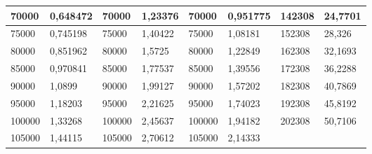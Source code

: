 \documentclass[11pt,openany]{book}
\begin{document}
\begin{table}[!ht]
\begin{tabular}{|l|l|l|l|l|l|l|l|}
        70000                                             & 0,648472                                           & 70000                                               & 1,23376                                             & 70000           & 0,951775        & 142308          & 24,7701         \\ \hline
        75000                                             & 0,745198                                           & 75000                                               & 1,40422                                             & 75000           & 1,08181         & 152308          & 28,326          \\ \hline
        80000                                             & 0,851962                                           & 80000                                               & 1,5725                                              & 80000           & 1,22849         & 162308          & 32,1693         \\ \hline
        85000                                             & 0,970841                                           & 85000                                               & 1,77537                                             & 85000           & 1,39556         & 172308          & 36,2288         \\ \hline
        90000                                             & 1,0899                                             & 90000                                               & 1,99127                                             & 90000           & 1,57202         & 182308          & 40,7869         \\ \hline
        95000                                             & 1,18203                                            & 95000                                               & 2,21625                                             & 95000           & 1,74023         & 192308          & 45,8192         \\ \hline
        100000                                            & 1,33268                                            & 100000                                              & 2,45637                                             & 100000          & 1,94182         & 202308          & 50,7106         \\ \hline
        105000                                            & 1,44115                                            & 105000                                              & 2,70612                                             & 105000          & 2,14333         & ~               & ~               \\ \hline

\end{tabular}
\end{table}
\end{document}

